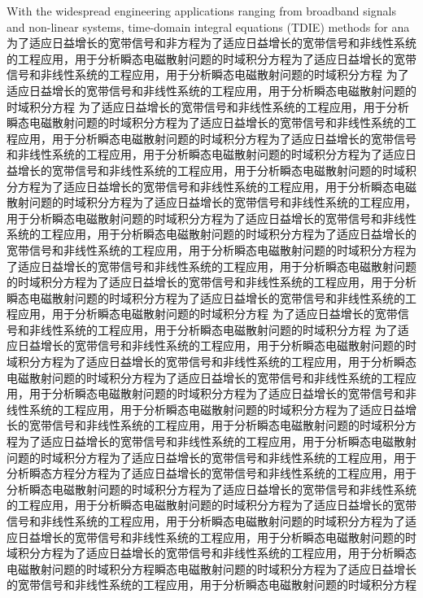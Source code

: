 \begin{englishabstract}
With the widespread engineering applications ranging from broadband signals and non-linear systems, time-domain integral equations (TDIE) methods for ana为了适应日益增长的宽带信号和非方程为了适应日益增长的宽带信号和非线性系统的工程应用，用于分析瞬态电磁散射问题的时域积分方程为了适应日益增长的宽带信号和非线性系统的工程应用，用于分析瞬态电磁散射问题的时域积分方程
为了适应日益增长的宽带信号和非线性系统的工程应用，用于分析瞬态电磁散射问题的时域积分方程
为了适应日益增长的宽带信号和非线性系统的工程应用，用于分析瞬态电磁散射问题的时域积分方程为了适应日益增长的宽带信号和非线性系统的工程应用，用于分析瞬态电磁散射问题的时域积分方程为了适应日益增长的宽带信号和非线性系统的工程应用，用于分析瞬态电磁散射问题的时域积分方程为了适应日益增长的宽带信号和非线性系统的工程应用，用于分析瞬态电磁散射问题的时域积分方程为了适应日益增长的宽带信号和非线性系统的工程应用，用于分析瞬态电磁散射问题的时域积分方程为了适应日益增长的宽带信号和非线性系统的工程应用，用于分析瞬态电磁散射问题的时域积分方程为了适应日益增长的宽带信号和非线性系统的工程应用，用于分析瞬态电磁散射问题的时域积分方程为了适应日益增长的宽带信号和非线性系统的工程应用，用于分析瞬态电磁散射问题的时域积分方程为了适应日益增长的宽带信号和非线性系统的工程应用，用于分析瞬态电磁散射问题的时域积分方程为了适应日益增长的宽带信号和非线性系统的工程应用，用于分析瞬态电磁散射问题的时域积分方程为了适应日益增长的宽带信号和非线性系统的工程应用，用于分析瞬态电磁散射问题的时域积分方程
为了适应日益增长的宽带信号和非线性系统的工程应用，用于分析瞬态电磁散射问题的时域积分方程
为了适应日益增长的宽带信号和非线性系统的工程应用，用于分析瞬态电磁散射问题的时域积分方程为了适应日益增长的宽带信号和非线性系统的工程应用，用于分析瞬态电磁散射问题的时域积分方程为了适应日益增长的宽带信号和非线性系统的工程应用，用于分析瞬态电磁散射问题的时域积分方程为了适应日益增长的宽带信号和非线性系统的工程应用，用于分析瞬态电磁散射问题的时域积分方程为了适应日益增长的宽带信号和非线性系统的工程应用，用于分析瞬态电磁散射问题的时域积分方程为了适应日益增长的宽带信号和非线性系统的工程应用，用于分析瞬态电磁散射问题的时域积分方程为了适应日益增长的宽带信号和非线性系统的工程应用，用于分析瞬态方程分方程为了适应日益增长的宽带信号和非线性系统的工程应用，用于分析瞬态电磁散射问题的时域积分方程为了适应日益增长的宽带信号和非线性系统的工程应用，用于分析瞬态电磁散射问题的时域积分方程为了适应日益增长的宽带信号和非线性系统的工程应用，用于分析瞬态电磁散射问题的时域积分方程为了适应日益增长的宽带信号和非线性系统的工程应用，用于分析瞬态电磁散射问题的时域积分方程为了适应日益增长的宽带信号和非线性系统的工程应用，用于分析瞬态电磁散射问题的时域积分方程瞬态电磁散射问题的时域积分方程为了适应日益增长的宽带信号和非线性系统的工程应用，用于分析瞬态电磁散射问题的时域积分方程

\end{englishabstract}
